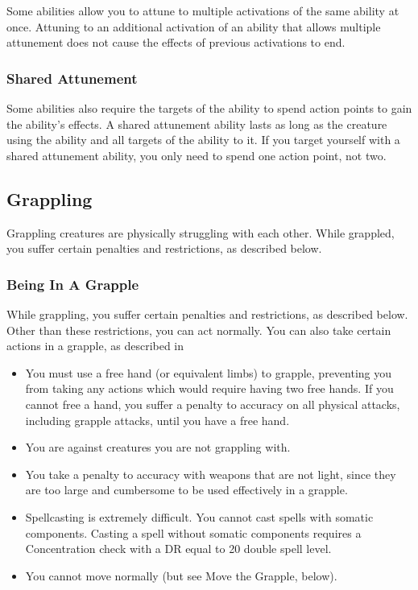             Some abilities allow you to attune to multiple activations of the same ability at once.
            Attuning to an additional activation of an ability that allows multiple attunement does not cause the effects of previous activations to end.

        \subsubsection{Shared Attunement}\label{Shared Attunement}
            Some abilities also require the targets of the ability to spend action points to gain the ability's effects.
            A shared attunement ability lasts as long as the creature using the ability and all targets of the ability  to it.
            If you target yourself with a shared attunement ability, you only need to spend one action point, not two.

    \subsection{Grappling}\label{Grappling}
        Grappling creatures are physically struggling with each other. While grappled, you suffer certain penalties and restrictions, as described below.

        \subsubsection{Being In A Grapple}
            While grappling, you suffer certain penalties and restrictions, as described below. Other than these restrictions, you can act normally. You can also take certain actions in a grapple, as described in 
            \begin{itemize}
                \item You must use a free hand (or equivalent limbs) to grapple, preventing you from taking any actions which would require having two free hands. If you cannot free a hand, you suffer a  penalty to accuracy on all physical attacks, including grapple attacks, until you have a free hand.
                \item You are  against creatures you are not grappling with.
                \item You take a  penalty to accuracy with weapons that are not light, since they are too large and cumbersome to be used effectively in a grapple.
                \item Spellcasting is extremely difficult. You cannot cast spells with somatic components. Casting a spell without somatic components requires a Concentration check with a DR equal to 20 \add double spell level.
                \item You cannot move normally (but see Move the Grapple, below).
            \end{itemize}

